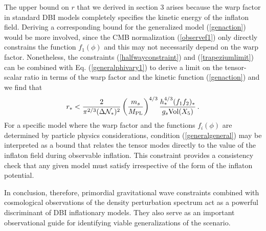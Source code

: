 The upper bound on $r$ that we derived in section 3 arises 
because the warp factor in standard DBI models 
completely specifies the kinetic 
energy of the inflaton field. Deriving a corresponding bound for 
the generalized model (\ref{genaction}) would be more involved, 
since the CMB normalization (\ref{observef1}) only 
directly constrains the function 
$f_1 (\phi )$ and this may not necessarily depend on the warp factor. 
Nonetheless, the constraints (\ref{halfwayconstraint}) and
(\ref{trapeziumlimit}) can be 
combined with Eq. (\ref{generalphivary1}) to derive a limit 
on the tensor-scalar ratio in terms of the warp factor and the 
kinetic function (\ref{genaction}) and we find that  
\begin{equation}
\label{generalgeneral}
r_* < \frac{2}{\pi^{2/3} ( \Delta \mathcal{N}_*)^2}
\left( \frac{m_s}{M_{\mathrm{PL}}} \right)^{4/3} 
\frac{h_*^{4/3} (f_1f_2)_*}{g_s\mathrm{Vol}(X_5)}  \,.
\end{equation}
For a specific model where the warp factor and 
the functions $f_i (\phi )$ are determined by particle 
physics considerations,   
condition (\ref{generalgeneral}) 
may be interpreted as a bound that relates 
the tensor modes directly to the value of the inflaton field during observable 
inflation. This constraint provides a consistency 
check that any given model must satisfy 
irrespective of the form of the inflaton potential. 

In conclusion, therefore, primordial gravitational wave constraints 
combined with cosmological observations of the density perturbation
spectrum act as a powerful discriminant of DBI inflationary models. 
They also serve as an important 
observational guide for identifying viable 
generalizations of the scenario. 
